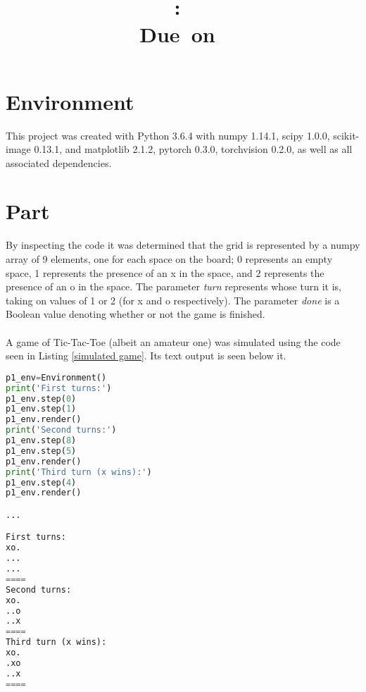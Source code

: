 \documentclass{article}
\title{
	\vspace{2in}
	\textmd{\textbf{\hmwkClass:\ \hmwkTitle}}\\
	\normalsize\vspace{0.1in}\small{Due\ on\ \hmwkDueDate}\\
	\vspace{0.1in}
	\vspace{3in}
}
\author{\textbf{\hmwkAuthorName}}
\newcommand{\enterproblemHeader}[1]{
}
\newcommand{\exitproblemHeader}[1]{
}
\newcounter{problem} %
\newcommand{\problemName}{}
\newenvironment{problem}[1][Part \theproblem]{ %
	\stepcounter{problem} %
	\renewcommand{\problemName}{#1} %
	\section{\problemName} %
	\enterproblemHeader{\problemName} %
}{
	\exitproblemHeader{\problemName} %
}
\begin{document}
\maketitle
\clearpage


\begin{problem}[Environment]	
	This project was created with Python 3.6.4 with numpy 1.14.1, scipy 1.0.0, scikit-image 0.13.1, and matplotlib 2.1.2, pytorch 0.3.0, torchvision 0.2.0, as well as all associated dependencies.
\end{problem}
\clearpage

\FloatBarrier
\begin{problem}
By inspecting the code it was determined that the grid is represented by a numpy array of 9 elements, one for each space on the board; 0 represents an empty space, 1 represents the presence of an x in the space, and 2 represents the presence of an o in the space. The parameter \textit{turn} represents whose turn it is, taking on values of 1 or 2 (for x and o respectively). The parameter \textit{done} is a Boolean value denoting whether or not the game is finished.\\\\
A game of Tic-Tac-Toe (albeit an amateur one) was simulated using the code seen in Listing \ref{simulated game}. Its text output is seen below it.

\begin{lstlisting}[language=Python, caption=Simulated game of Tic-Tac-Toe, label=simulated game] 
p1_env=Environment()
print('First turns:')
p1_env.step(0)
p1_env.step(1)
p1_env.render()
print('Second turns:')
p1_env.step(8)
p1_env.step(5)
p1_env.render()
print('Third turn (x wins):')
p1_env.step(4)
p1_env.render()

...

First turns:
xo.
...
...
====
Second turns:
xo.
..o
..x
====
Third turn (x wins):
xo.
.xo
..x
====
\end{lstlisting}
	
	
\end{problem}
\clearpage
\end{document}
